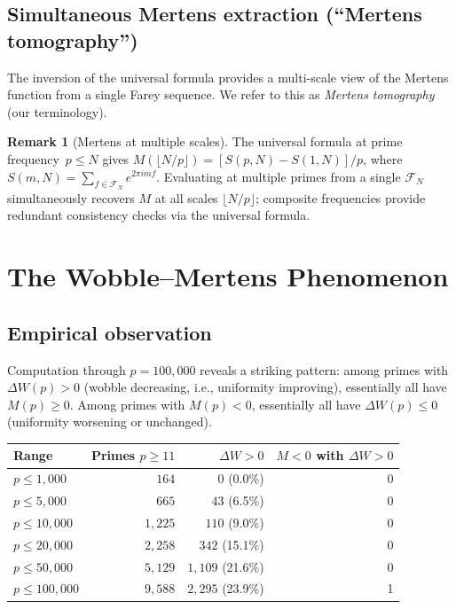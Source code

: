 \documentclass[11pt]{article}
\theoremstyle{definition}
\newtheorem{remark}[theorem]{Remark}
\newcommand{\F}{\mathcal{F}}
\begin{document}
\subsection{Simultaneous Mertens extraction (``Mertens tomography'')}

The inversion of the universal formula provides a multi-scale
view of the Mertens function from a single Farey
sequence. We refer to this as \emph{Mertens tomography} (our terminology).

\begin{remark}[Mertens at multiple scales]
The universal formula at prime frequency~$p \le N$ gives
$M(\lfloor N/p \rfloor) = [S(p,N) - S(1,N)]/p$,
where $S(m,N) = \sum_{f \in \F_N} e^{2\pi imf}$.
Evaluating at multiple primes from a single $\F_N$ simultaneously
recovers $M$ at all scales $\lfloor N/p \rfloor$; composite
frequencies provide redundant consistency checks via
the universal formula.
\end{remark}


\section{The Wobble--Mertens Phenomenon}\label{sec:phenomenon}

\subsection{Empirical observation}

Computation through $p = 100{,}000$ reveals a striking pattern:
among primes with $\Delta W(p) > 0$ (wobble decreasing, i.e.,
uniformity improving), essentially all have $M(p) \ge 0$.  Among
primes with $M(p) < 0$, essentially all have $\Delta W(p) \le 0$
(uniformity worsening or unchanged).

\begin{center}
\begin{tabular}{lrrr}
\toprule
Range & Primes $p \ge 11$ & $\Delta W > 0$ & $M < 0$ with $\Delta W > 0$ \\
\midrule
$p \le 1{,}000$ & $164$ & $0$ (0.0\%) & 0 \\
$p \le 5{,}000$ & $665$ & $43$ (6.5\%) & 0 \\
$p \le 10{,}000$ & $1{,}225$ & $110$ (9.0\%) & 0 \\
$p \le 20{,}000$ & $2{,}258$ & $342$ (15.1\%) & 0 \\
$p \le 50{,}000$ & $5{,}129$ & $1{,}109$ (21.6\%) & 0 \\
$p \le 100{,}000$ & $9{,}588$ & $2{,}295$ (23.9\%) & 1 \\
\bottomrule
\end{tabular}
\end{center}
\end{document}
